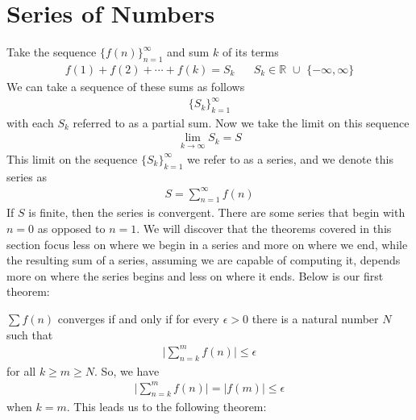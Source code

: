 \section{Series of Numbers}

\begin{definition}
Take the sequence $\{f(n)\}_{n=1}^{\infty}$ and sum $k$ of its terms
\begin{align*}
    f(1) + f(2) + \cdots + f(k) = S_{k} \hspace{20pt} S_{k} \in \mathbb{R} \hspace{4pt} \cup \hspace{4pt} \{-\infty, \infty\}
\end{align*}
We can take a sequence of these sums as follows
\begin{align*}
    \{S_{k}\}_{k=1}^{\infty}
\end{align*}
with each $S_{k}$ referred to as a partial sum. Now we take the limit on this sequence
\begin{align*}
    \lim_{k \longrightarrow \infty} S_{k} = S
\end{align*}
This limit on the sequence $\{S_{k}\}_{k=1}^{\infty}$ we refer to as a series, and we denote this series as 
\begin{align*}
    S = \sum_{n=1}^{\infty} f(n)
\end{align*}
If $S$ is finite, then the series is convergent. There are some series that begin with $n=0$ as opposed to $n=1$. We will discover that the theorems covered in this section focus less on where we begin in a series and more on where we end, while the resulting sum of a series, assuming we are capable of computing it, depends more on where the series begins and less on where it ends. Below is our first theorem:
\end{definition}

\begin{theorem}
$\sum f(n)$ converges if and only if for every $\epsilon > 0$ there is a natural number $N$ such that 
\begin{align*}
    \Big\lvert \sum_{n = k}^{m} f(n) \Big\rvert \leq \epsilon
\end{align*}
for all $k \geq m \geq N$. So, we have
\begin{align*}
    \Big\lvert \sum_{n = k}^{m} f(n) \Big\rvert = \lvert f(m) \rvert \leq \epsilon
\end{align*}
when $k = m$. This leads us to the following theorem:
\end{theorem}

